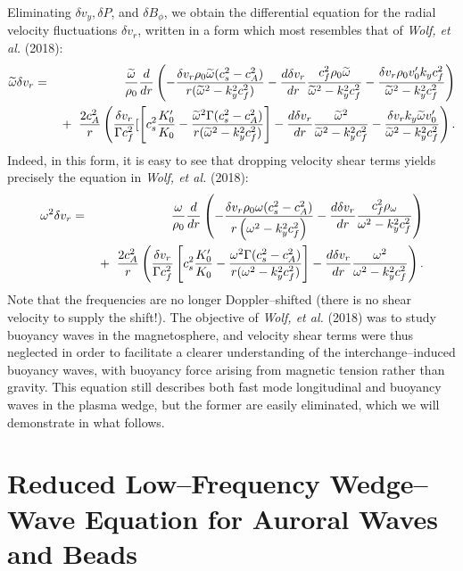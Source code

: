 \documentclass[a4paper,openany,12pt]{book}
\begin{document}
Eliminating $\delta v_y, \delta P$, and $\delta B_\phi$, we obtain the differential equation for the radial velocity fluctuations $\delta v_r$, written in a form which most resembles that of \emph{Wolf, et al.} (2018):
\begin{eqnarray}
\widetilde\omega\delta v_r&=&\frac{\widetilde\omega}{\rho_0}{d\over dr}\left(-\frac{\delta v_r\rho_0\widetilde\omega(c_s^2-c_A^2)}{r(\widetilde\omega^2-k_y^2c_f^2)}-\frac{d\delta v_r}{dr}\frac{c_f^2\rho_0\widetilde\omega}{\widetilde\omega^2-k_y^2c_f^2}-\frac{\delta v_r\rho_0v'_0 k_y c_f^2}{\widetilde\omega^2-k_y^2c_f^2}\right)\nonumber\\
&&\mbox{}+\ \frac{2c_A^2}{r}\left(\frac{\delta v_r}{\Gamma c_f^2}[\left[c_s^2\frac{K'_0}{K_0}-\frac{\widetilde\omega^2\Gamma(c_s^2-c_A^2)}{r(\widetilde\omega^2-k_y^2c_f^2)}\right]-\frac{d\delta v_r}{dr}\frac{\widetilde\omega^2}{\widetilde\omega^2-k_y^2c_f^2}-\frac{\delta v_rk_y\widetilde\omega v'_0}{\widetilde\omega^2-k_y^2c_f^2}\right).\label{E9.107}
\end{eqnarray}
Indeed, in this form, it is easy to see that dropping velocity shear terms yields precisely the equation in \emph{Wolf, et al.} (2018):
\begin{eqnarray}
\omega^2\delta v_r&=&\frac{\omega}{\rho_0}{d\over dr}\left(-{\delta v_r\rho_0\omega(c_s^2-c_A^2)\over r\left(\omega^2-k_y^2c_f^2\right)}-{d\delta v_r\over dr}{c_f^2\rho_\omega\over \omega^2-k_y^2 c_f^2}\right)\nonumber\\
&&\mbox{}+\ {2c_A^2\over r}\left({\delta v_r\over \Gamma c_f^2}\left[c_s^2{K'_0\over K_0}-{\omega^2\Gamma(c_s^2-c_A^2)\over r(\omega^2-k_y^2c_f^2)}\right]-{d\delta v_r\over dr}{\omega^2\over \omega^2-k_y^2c_f^2}\right).\label{E9.108}
\end{eqnarray}
Note that the frequencies are no longer Doppler--shifted (there is no shear velocity to supply the shift!). The objective of \emph{Wolf, et al.} (2018) was to study buoyancy waves in the magnetosphere, and velocity shear terms were thus neglected in order to facilitate a clearer understanding of the interchange--induced buoyancy waves, with buoyancy force arising from magnetic tension rather than gravity. This equation still describes both fast mode longitudinal and buoyancy waves in the plasma wedge, but the former are easily eliminated, which we will demonstrate in what follows.

\section[Reduced Low--Frequency Wedge]{Reduced Low--Frequency Wedge--Wave Equation for Auroral Waves and Beads}
\end{document}
